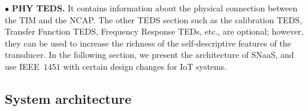 \documentclass[conference]{IEEEtran}
\begin{document}
\vspace{1mm}
\newline
\noindent
$\bullet$ \textbf{PHY TEDS.} It contains information about the physical connection between the TIM and the NCAP.
\vspace{1mm}
\newline
\noindent
The other TEDS section such as the calibration TEDS, Transfer Function TEDS, Frequency Response TEDs, etc., are optional; however, they can be used to increase the richness of the self-descriptive features of the transducer.
\newline
\indent
In the following section, we present the architecture of SNaaS, and use IEEE~$1451$ with certain design changes for IoT systems.

\subsection{System architecture}
\end{document}
